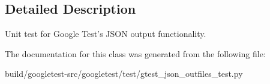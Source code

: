 \subsection{Detailed Description}
\begin{DoxyVerb}Unit test for Google Test's JSON output functionality.\end{DoxyVerb}
 

The documentation for this class was generated from the following file\+:\begin{DoxyCompactItemize}
\item 
build/googletest-\/src/googletest/test/gtest\+\_\+json\+\_\+outfiles\+\_\+test.\+py\end{DoxyCompactItemize}
